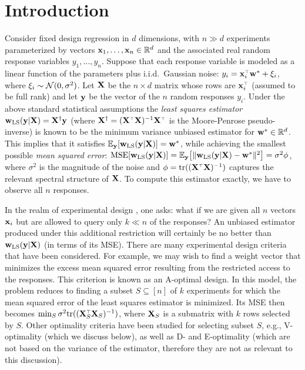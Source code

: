 \documentclass[12pt]{sty/colt2019/colt2018-arxiv}
\begin{document}
\section{Introduction}
Consider fixed design regression in $d$ dimensions, with $n\gg d$
experiments parameterized by vectors $\mathbf x_1,\dots,\mathbf x_n\in\mathbb R^d$ and the
associated real random response variables $y_1,\dots,y_n$. Suppose
that each response variable is modeled as a linear function of the
parameters plus i.i.d.~Gaussian noise:
$y_i=\x_i^\top\w^*+\xi_i$, where $\xi_i\sim\mathcal{N}(0,\sigma^2)$. 
Let $\mathbf X$ be the $n\times d$ matrix whose rows are $\x_i^\top$ 
(assumed to be full rank)
and let $\mathbf y$ be the vector of the $n$ random responses
$y_i$. Under the above standard statistical assumptions the \textit{least squares estimator}
$\mathbf w_{\mathrm{LS}}(\mathbf y|\mathbf X)=\mathbf X^\dagger \mathbf y$ (where $\X^\dagger=(\X^\top\X)^{-1}\X^\top$ is
the Moore-Penrose pseudo-inverse) is known to be the minimum
variance unbiased estimator for $\mathbf w^*\in\mathbb R^d$.
This implies that it satisfies $\mathbb E_\mathbf y[\mathbf w_{\mathrm{LS}}(\mathbf y|\mathbf X)]=\mathbf w^*$, while achieving the smallest possible \textit{mean squared error}:
$\text{MSE}[\mathbf w_{\mathrm{LS}}(\mathbf y|\mathbf X)]=\mathbb E_\mathbf y\big[\|\mathbf w_{\mathrm{LS}}(\mathbf y|\mathbf X)-\mathbf w^*\|^2\big]=\sigma^2\phi$, where
$\sigma^2$ is the magnitude of the noise and $\phi=\tr((\X^\top\X)^{-1})$ captures the relevant spectral structure of $\mathbf X$. 
To compute this estimator exactly, we have to observe all $n$ responses. 

In the realm of experimental design \citep{optimal-design-book}, one asks: what if we are given all
$n$ vectors $\mathbf x_i$ but are allowed to query only $k\ll n$ of the
responses? An unbiased estimator produced under this additional
restriction will certainly be no better than $\mathbf w_{\mathrm{LS}}(\mathbf y|\mathbf X)$ (in terms of its MSE). 
There are many experimental design criteria that have been considered.
For example, we may wish to find a weight vector that minimizes the excess mean squared error resulting from the restricted access to the responses. 
This criterion is known as an A-optimal design. 
In this model, the problem reduces to finding a
subset $S\subseteq [n]$ of $k$ experiments for which the mean squared
error of the least squares estimator is minimized. Its MSE then becomes
$\min_S\sigma^2\tr((\X_S^\top\X_S)^{-1})$, where $\mathbf X_S$ is a submatrix
with $k$ rows selected by $S$.
Other optimality criteria have been studied for selecting subset $S$,
e.g., V-optimality (which we discuss below), as well as D- and
E-optimality (which are not based on the variance of the estimator,
therefore they are not as relevant to this discussion).   
\end{document}
